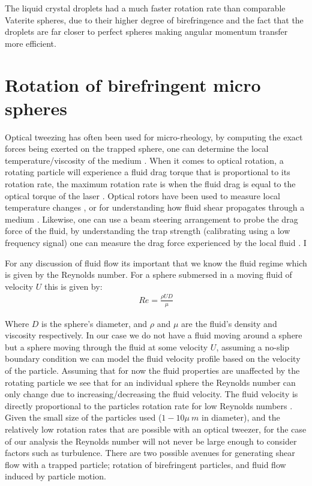 The liquid crystal droplets had a much faster rotation rate than comparable 
Vaterite spheres, due to their higher degree of birefringence and the fact
that the droplets are far closer to perfect spheres making angular momentum
transfer more efficient. 

\section{Rotation of birefringent micro spheres} 
Optical tweezing has often been used for micro-rheology, by computing the
exact forces being exerted on the trapped sphere, one can determine the
local temperature/viscosity of the medium \cite{Millen2014, RodriguezSevilla2018}.
When it comes to optical rotation, a rotating particle will experience a
fluid drag torque that is proportional to its rotation rate, the maximum 
rotation rate is when the fluid drag is equal to the optical torque 
of the laser \cite{RodriguezSevilla2018}. Optical rotors have been used
to measure local temperature changes \cite{Millen2014}, or for understanding 
how fluid shear propagates through a medium \cite{Knoener2005}. Likewise, 
one can use a beam steering arrangement to probe the drag force of the 
fluid, by understanding the trap strength (calibrating using a low 
frequency signal) one can measure the drag force experienced by the local 
fluid \cite{RobertsonAnderson2018}. I

For any discussion of fluid flow its important that we know the fluid 
regime which is given by the Reynolds number. For a sphere submersed in a 
moving fluid of velocity $U$ this is given by:
\begin{align}
	Re = \frac{\rho UD}{\mu}
\end{align}

Where $D$ is the sphere's diameter, and $\rho$ and $\mu$ are the fluid's 
density and viscosity respectively. In our case we do not have a fluid
moving around a sphere but a sphere moving through the fluid at some 
velocity $U$, assuming a no-slip boundary condition we can model the 
fluid velocity profile based on the velocity of the particle. Assuming
that for now the fluid properties are unaffected by the rotating particle
we see that for an individual sphere the Reynolds number can only change 
due to increasing/decreasing the fluid velocity. The fluid velocity is 
directly proportional to the particles rotation rate for low Reynolds
numbers \cite{Bruce2020}. Given the small size of the particles used 
($1-10\mu\ m$ in diameter), and the relatively low rotation rates that 
are possible with an optical tweezer, for the case of our analysis the
Reynolds number will not never be large enough to consider factors such
as turbulence. There are two possible avenues for generating shear flow 
with a trapped particle; rotation of birefringent particles, and fluid 
flow induced by particle motion. 

